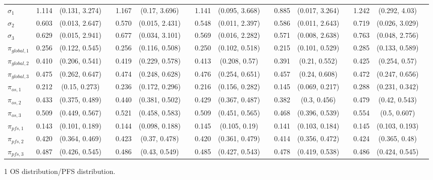 \documentclass[AMA,STIX1COL]{WileyNJD-v2}
\begin{document}
\begin{landscape}
\begin{center}
\begin{table}[t]
\begin{tabular}{l c c c c c c c c c c c c c c c}
$\sigma_1$ & 1.114 & (0.131, 3.274) &  & 1.167 & (0.17, 3.696) &  & 1.141 & (0.095, 3.668) &  & 0.885 & (0.017, 3.264) &  & 1.242 & (0.292, 4.03) & \\
$\sigma_2$ & 0.603 & (0.013, 2.647) &  & 0.570 & (0.015, 2.431) &  & 0.548 & (0.011, 2.397) &  & 0.586 & (0.011, 2.643) &  & 0.719 & (0.026, 3.029) & \\
$\sigma_3$ & 0.629 & (0.015, 2.941) &  & 0.677 & (0.034, 3.101) &  & 0.569 & (0.016, 2.282) &  & 0.571 & (0.008, 2.638) &  & 0.763 & (0.048, 2.756) & \\
$\pi_{global, 1}$ & 0.256 & (0.122, 0.545) &  & 0.256 & (0.116, 0.508) &  & 0.250 & (0.102, 0.518) &  & 0.215 & (0.101, 0.529) &  & 0.285 & (0.133, 0.589) & \\
$\pi_{global, 2}$ & 0.410 & (0.206, 0.541) &  & 0.419 & (0.229, 0.578) &  & 0.413 & (0.208, 0.57) &  & 0.391 & (0.21, 0.552) &  & 0.425 & (0.254, 0.57) & \\
$\pi_{global, 3}$ & 0.475 & (0.262, 0.647) &  & 0.474 & (0.248, 0.628) &  & 0.476 & (0.254, 0.651) &  & 0.457 & (0.24, 0.608) &  & 0.472 & (0.247, 0.656) & \\
$\pi_{os, 1}$ & 0.212 & (0.15, 0.273) &  & 0.236 & (0.172, 0.296) &  & 0.216 & (0.156, 0.282) &  & 0.145 & (0.069, 0.217) &  & 0.288 & (0.231, 0.342) & \\
$\pi_{os, 2}$ & 0.433 & (0.375, 0.489) &  & 0.440 & (0.381, 0.502) &  & 0.429 & (0.367, 0.487) &  & 0.382 & (0.3, 0.456) &  & 0.479 & (0.42, 0.543) & \\
$\pi_{os, 3}$ & 0.509 & (0.449, 0.567) &  & 0.521 & (0.458, 0.583) &  & 0.509 & (0.451, 0.565) &  & 0.468 & (0.396, 0.539) &  & 0.554 & (0.5, 0.607) & \\
$\pi_{pfs, 1}$ & 0.143 & (0.101, 0.189) &  & 0.144 & (0.098, 0.188) &  & 0.145 & (0.105, 0.19) &  & 0.141 & (0.103, 0.184) &  & 0.145 & (0.103, 0.193) & \\
$\pi_{pfs, 2}$ & 0.420 & (0.364, 0.469) &  & 0.423 & (0.37, 0.478) &  & 0.420 & (0.361, 0.479) &  & 0.414 & (0.356, 0.472) &  & 0.424 & (0.365, 0.48) & \\
$\pi_{pfs, 3}$ & 0.487 & (0.426, 0.545) &  & 0.486 & (0.43, 0.549) &  & 0.485 & (0.427, 0.543) &  & 0.478 & (0.419, 0.538) &  & 0.486 & (0.424, 0.545) & \\
\bottomrule
\end{tabular}
\begin{tablenotes}%
\item[1] OS distribution/PFS distribution.
\end{tablenotes}
\end{table}
\end{center}
\end{landscape}
\end{document}
